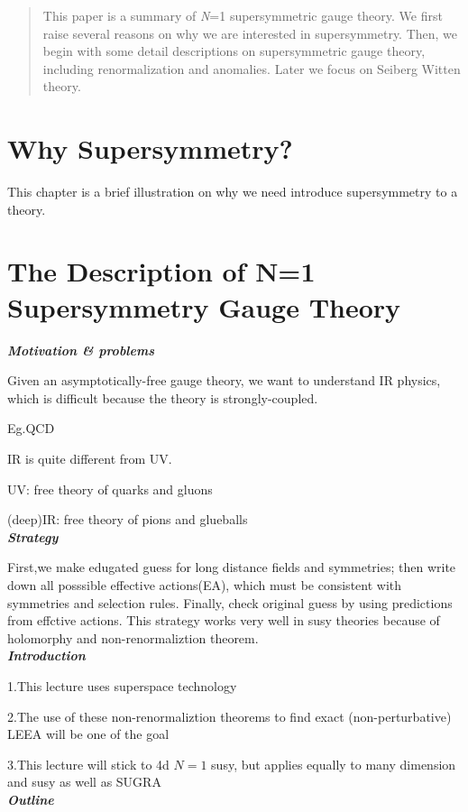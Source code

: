 \documentclass[type = bachelor]{fduthesis-en}
\begin{document}
  \tableofcontents
  \begin{abstract}
	  This paper is a summary of \textit{N}=1 supersymmetric 
	  gauge theory. We first raise several reasons on why we 
	  are interested in supersymmetry. Then, we begin with 
	  some detail descriptions on supersymmetric gauge theory, 
	  including renormalization and anomalies. Later we focus 
	  on Seiberg Witten theory. 
   \end{abstract}
   
\chapter{Why Supersymmetry?}
	  This chapter is a brief illustration on why we need introduce 
	  supersymmetry to a theory. 
	
\chapter{The Description of N=1 Supersymmetry Gauge Theory}

\noindent\textbf{\emph{Motivation \& problems}}

Given an asymptotically-free gauge theory, we want to understand IR physics, which is difficult because the theory is strongly-coupled.

Eg.QCD

IR is quite different from UV.

UV: free theory of quarks and gluons

(deep)IR: free theory of pions and glueballs
\bigskip\\
\textbf{\emph{Strategy}}

First,we make edugated guess for  long distance fields and symmetries; then write down all posssible effective actions(EA), which must be consistent with symmetries and selection rules. Finally, check original guess by using predictions from effctive actions. This strategy works very well in susy theories because of holomorphy and non-renormaliztion theorem.
\bigskip\\
\textbf{\emph{Introduction}}

1.This lecture uses superspace technology

2.The use of these non-renormaliztion theorems to find exact (non-perturbative) LEEA will be one of the goal

3.This lecture will stick to 4d $N=1$ susy, but applies equally to many dimension and susy as well as SUGRA
\bigskip\\
\textbf{\emph{Outline}}
\end{document}
